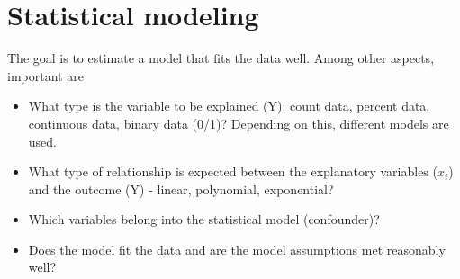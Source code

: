 \documentclass[12pt,a4paper]{article}
\begin{document}
\section{Statistical modeling}
The goal is to estimate a model that fits the data well. Among other aspects, important are
\begin{itemize}
\item What type is the variable to be explained (Y): count data, percent data, continuous data, binary data (0/1)? Depending on this, different models are used.
\item What type of relationship is expected between the explanatory variables ($x_i$) and the outcome (Y) - linear, polynomial, exponential?
\item Which variables belong into the statistical model (confounder)?
\item Does the model fit the data and are the model assumptions met reasonably well? 
\end{itemize}

\newpage


%
%

\end{document}
